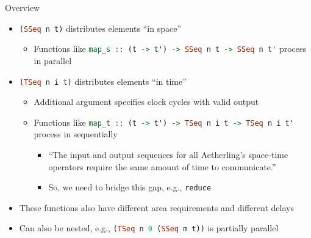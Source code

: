 \begin{frame}[allowframebreaks]{Overview}
    \begin{itemize}
        \item \lstinline[language=Haskell]{(SSeq n t)} distributes elements ``in space''
        \begin{itemize}
            \item Functions like \lstinline[language=Haskell]|map_s :: (t -> t') -> SSeq n t -> SSeq n t'| process in parallel
        \end{itemize}
        \item \lstinline[language=Haskell]{(TSeq n i t)} distributes elements ``in time''
        \begin{itemize}
            \item Additional argument specifies clock cycles with valid output
            \item Functions like \lstinline[language=Haskell]|map_t :: (t -> t') -> TSeq n i t -> TSeq n i t'| process in sequentially
            \begin{itemize}
                \item ``The input and output sequences for all Aetherling's space-time operators require the same amount of time to communicate.''
                \item So, we need to bridge this gap, e.g., \lstinline[language=Haskell]|reduce|
            \end{itemize}
        \end{itemize}
        \item These functions also have different area requirements and different delays
        \item Can also be nested, e.g., \lstinline[language=Haskell]{(TSeq n 0 (SSeq m t))} is partially parallel
    \end{itemize}

\end{frame}

